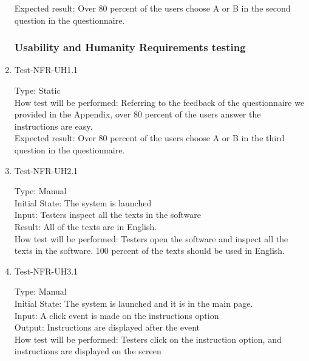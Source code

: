 \documentclass[12pt, titlepage]{article}
\begin{document}
\begin{enumerate}
Expected result: Over 80 percent of the users choose A or B in the second question in the questionnaire.

\subsubsection{Usability and Humanity Requirements testing}
\item{Test-NFR-UH1.1\\}

Type: Static\\

How test will be performed: Referring to the feedback of the questionnaire we provided in the Appendix, over 80 percent of the users answer the instructions are easy.\\

Expected result: Over 80 percent of the users choose A or B in the third question in the questionnaire.

\item{Test-NFR-UH2.1\\}

Type: Manual\\

Initial State: The system is launched\\

Input: Testers inspect all the texts in the software \\

Result: All of the texts are in English.\\

How test will be performed: Testers open the software and inspect all the texts in the software. 100 percent of the texts should be used in English.

\item{Test-NFR-UH3.1\\}

Type: Manual\\

Initial State: The system is launched and it is in the main page.\\

Input: A click event is made on the instructions option\\

Output: Instructions are displayed after the event\\

How test will be performed: Testers click on the instruction option, and instructions are displayed on the screen


\end{enumerate}
\end{document}
